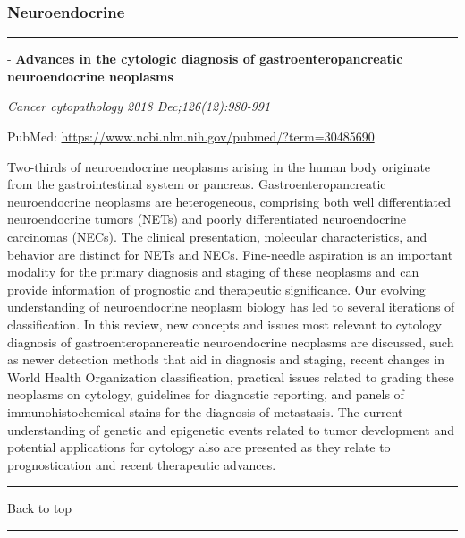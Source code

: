 \documentclass[]{article}
\begin{document}
\pagebreak

\hypertarget{neuroendocrine-1}{%
\subsubsection{Neuroendocrine}\label{neuroendocrine-1}}

\begin{center}\rule{0.5\linewidth}{\linethickness}\end{center}

 - \textbf{Advances in the cytologic diagnosis of gastroenteropancreatic
neuroendocrine neoplasms}

\emph{Cancer cytopathology 2018 Dec;126(12):980-991}

PubMed: \url{https://www.ncbi.nlm.nih.gov/pubmed/?term=30485690}

Two-thirds of neuroendocrine neoplasms arising in the human body
originate from the gastrointestinal system or pancreas.
Gastroenteropancreatic neuroendocrine neoplasms are heterogeneous,
comprising both well differentiated neuroendocrine tumors (NETs) and
poorly differentiated neuroendocrine carcinomas (NECs). The clinical
presentation, molecular characteristics, and behavior are distinct for
NETs and NECs. Fine-needle aspiration is an important modality for the
primary diagnosis and staging of these neoplasms and can provide
information of prognostic and therapeutic significance. Our evolving
understanding of neuroendocrine neoplasm biology has led to several
iterations of classification. In this review, new concepts and issues
most relevant to cytology diagnosis of gastroenteropancreatic
neuroendocrine neoplasms are discussed, such as newer detection methods
that aid in diagnosis and staging, recent changes in World Health
Organization classification, practical issues related to grading these
neoplasms on cytology, guidelines for diagnostic reporting, and panels
of immunohistochemical stains for the diagnosis of metastasis. The
current understanding of genetic and epigenetic events related to tumor
development and potential applications for cytology also are presented
as they relate to prognostication and recent therapeutic advances.

{}

{}

\begin{center}\rule{0.5\linewidth}{\linethickness}\end{center}

Back to top

\begin{center}\rule{0.5\linewidth}{\linethickness}\end{center}
\end{document}
